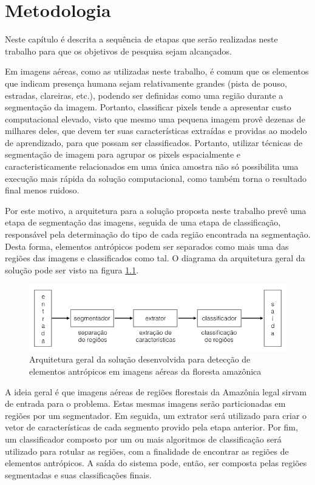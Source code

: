 \chapter{Metodologia}\label{cap:metodologia}

Neste capítulo é descrita a sequência de etapas que serão realizadas neste trabalho para que os objetivos de pesquisa sejam alcançados.

Em imagens aéreas, como as utilizadas neste trabalho, é comum que os elementos que indicam presença humana sejam relativamente grandes (pista de pouso, estradas, clareiras, etc.), podendo ser definidas como uma região durante a segmentação da imagem. Portanto, classificar pixels tende a apresentar custo computacional elevado, visto que mesmo uma pequena imagem provê dezenas de milhares deles, que devem ter suas características extraídas e providas ao modelo de aprendizado, para que possam ser classificados. Portanto, utilizar técnicas de segmentação de imagem para agrupar os pixels espacialmente e caracteristicamente relacionados em uma única amostra não só possibilita uma execução mais rápida da solução computacional, como também torna o resultado final menos ruidoso.

Por este motivo, a arquitetura para a solução proposta neste trabalho prevê uma etapa de segmentação das imagens, seguida de uma etapa de classificação, responsável pela determinação do tipo de cada região encontrada na segmentação. Desta forma, elementos antrópicos podem ser separados como mais uma das regiões das imagens e classificados como tal. O diagrama da arquitetura geral da solução pode ser visto na figura \ref{fig:metDiagramaGeral}.

\begin{figure}[h]
    \includegraphics[width=\textwidth]{imgs/arquitetura_geral}
    \caption{Arquitetura geral da solução desenvolvida para detecção de elementos antrópicos em imagens aéreas da floresta amazônica}
    \label{fig:metDiagramaGeral}
\end{figure}

A ideia geral é que imagens aéreas de regiões florestais da Amazônia legal sirvam de entrada para o problema. Estas mesmas imagens serão particionadas em regiões por um segmentador. Em seguida, um extrator será utilizado para criar o vetor de características de cada segmento provido pela etapa anterior. Por fim, um classificador composto por um ou mais algoritmos de classificação será utilizado para rotular as regiões, com a finalidade de encontrar as regiões de elementos antrópicos. A saída do sistema pode, então, ser composta pelas regiões segmentadas e suas classificações finais.

